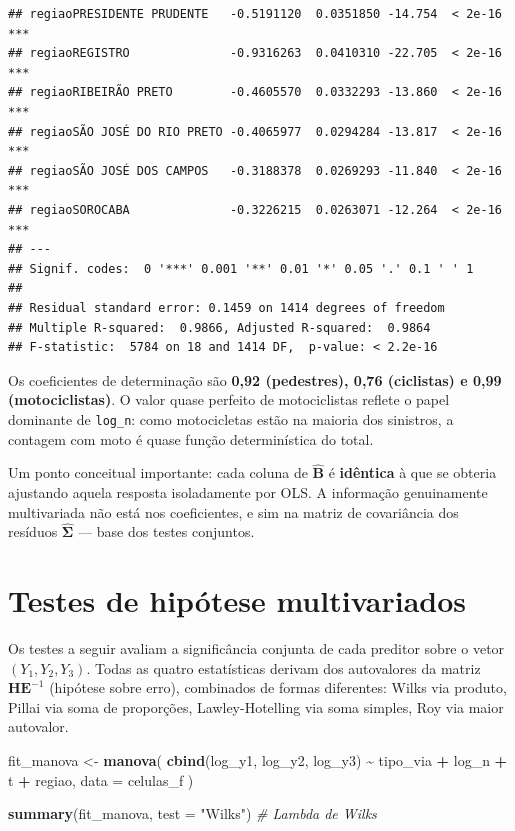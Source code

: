 \documentclass[
  11pt,
]{article}
\newenvironment{Shaded}{\begin{snugshade}}{\end{snugshade}}
\newcommand{\AttributeTok}[1]{\textcolor[rgb]{0.13,0.29,0.53}{#1}}
\newcommand{\CommentTok}[1]{\textcolor[rgb]{0.56,0.35,0.01}{\textit{#1}}}
\newcommand{\FunctionTok}[1]{\textcolor[rgb]{0.13,0.29,0.53}{\textbf{#1}}}
\newcommand{\NormalTok}[1]{#1}
\newcommand{\OtherTok}[1]{\textcolor[rgb]{0.56,0.35,0.01}{#1}}
\newcommand{\SpecialCharTok}[1]{\textcolor[rgb]{0.81,0.36,0.00}{\textbf{#1}}}
\newcommand{\StringTok}[1]{\textcolor[rgb]{0.31,0.60,0.02}{#1}}
\begin{document}
\begin{verbatim}
## regiaoPRESIDENTE PRUDENTE   -0.5191120  0.0351850 -14.754  < 2e-16 ***
## regiaoREGISTRO              -0.9316263  0.0410310 -22.705  < 2e-16 ***
## regiaoRIBEIRÃO PRETO        -0.4605570  0.0332293 -13.860  < 2e-16 ***
## regiaoSÃO JOSÉ DO RIO PRETO -0.4065977  0.0294284 -13.817  < 2e-16 ***
## regiaoSÃO JOSÉ DOS CAMPOS   -0.3188378  0.0269293 -11.840  < 2e-16 ***
## regiaoSOROCABA              -0.3226215  0.0263071 -12.264  < 2e-16 ***
## ---
## Signif. codes:  0 '***' 0.001 '**' 0.01 '*' 0.05 '.' 0.1 ' ' 1
## 
## Residual standard error: 0.1459 on 1414 degrees of freedom
## Multiple R-squared:  0.9866, Adjusted R-squared:  0.9864 
## F-statistic:  5784 on 18 and 1414 DF,  p-value: < 2.2e-16
\end{verbatim}

Os coeficientes de determinação são \textbf{0,92 (pedestres), 0,76
(ciclistas) e 0,99 (motociclistas)}. O valor quase perfeito de
motociclistas reflete o papel dominante de \texttt{log\_n}: como
motocicletas estão na maioria dos sinistros, a contagem com moto é quase
função determinística do total.

Um ponto conceitual importante: cada coluna de \(\hat{\mathbf{B}}\) é
\textbf{idêntica} à que se obteria ajustando aquela resposta
isoladamente por OLS. A informação genuinamente multivariada não está
nos coeficientes, e sim na matriz de covariância dos resíduos
\(\hat{\boldsymbol{\Sigma}}\) --- base dos testes conjuntos.

\newpage

\section{Testes de hipótese multivariados}\label{testes}

Os testes a seguir avaliam a significância conjunta de cada preditor
sobre o vetor \((Y_1, Y_2, Y_3)\). Todas as quatro estatísticas derivam
dos autovalores da matriz \(\mathbf{H}\mathbf{E}^{-1}\) (hipótese sobre
erro), combinados de formas diferentes: Wilks via produto, Pillai via
soma de proporções, Lawley-Hotelling via soma simples, Roy via maior
autovalor.

\begin{Shaded}
\begin{Highlighting}[]
\NormalTok{fit\_manova }\OtherTok{\textless{}{-}} \FunctionTok{manova}\NormalTok{(}
  \FunctionTok{cbind}\NormalTok{(log\_y1, log\_y2, log\_y3) }\SpecialCharTok{\textasciitilde{}}\NormalTok{ tipo\_via }\SpecialCharTok{+}\NormalTok{ log\_n }\SpecialCharTok{+}\NormalTok{ t }\SpecialCharTok{+}\NormalTok{ regiao,}
  \AttributeTok{data =}\NormalTok{ celulas\_f}
\NormalTok{)}

\FunctionTok{summary}\NormalTok{(fit\_manova, }\AttributeTok{test =} \StringTok{"Wilks"}\NormalTok{)             }\CommentTok{\# Lambda de Wilks}
\end{Highlighting}
\end{Shaded}
\end{document}
